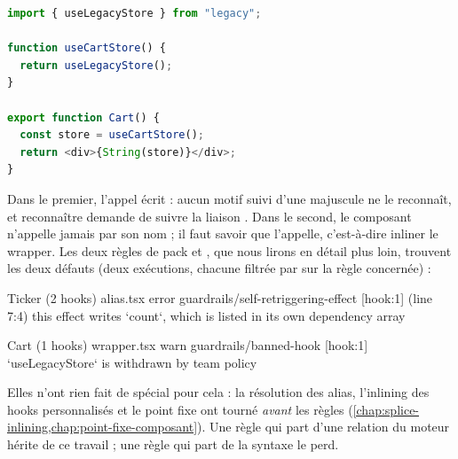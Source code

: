 \begin{lstlisting}[language=TypeScript,caption={Un hook retiré caché derrière un wrapper (\file{/tmp/ch22/wrapper.tsx})},label={lst:decl-wrapper}]
import { useLegacyStore } from "legacy";

function useCartStore() {
  return useLegacyStore();
}

export function Cart() {
  const store = useCartStore();
  return <div>{String(store)}</div>;
}
\end{lstlisting}

Dans le premier, l'appel écrit  : aucun motif \og {} suivi d'une majuscule\fg{} ne le reconnaît, et reconnaître  demande de suivre la liaison . Dans le second, le composant  n'appelle jamais  par son nom ; il faut savoir que  l'appelle, c'est-à-dire inliner le wrapper. Les deux règles de pack  et , que nous lirons en détail plus loin, trouvent les deux défauts (deux exécutions, chacune filtrée par  sur la règle concernée) :

\begin{sortie}
  Ticker  (2 hooks)  alias.tsx
    error  guardrails/self-retriggering-effect  [hook:1]  (line 7:4)  this effect writes `count`, which is listed in its own dependency array

  Cart  (1 hooks)  wrapper.tsx
    warn   guardrails/banned-hook  [hook:1]  `useLegacyStore` is withdrawn by team policy
\end{sortie}

Elles n'ont rien fait de spécial pour cela : la résolution des alias, l'inlining des hooks personnalisés et le point fixe ont tourné \emph{avant} les règles (\cref{chap:splice-inlining,chap:point-fixe-composant}). Une règle qui part d'une relation du moteur hérite de ce travail ; une règle qui part de la syntaxe le perd.

